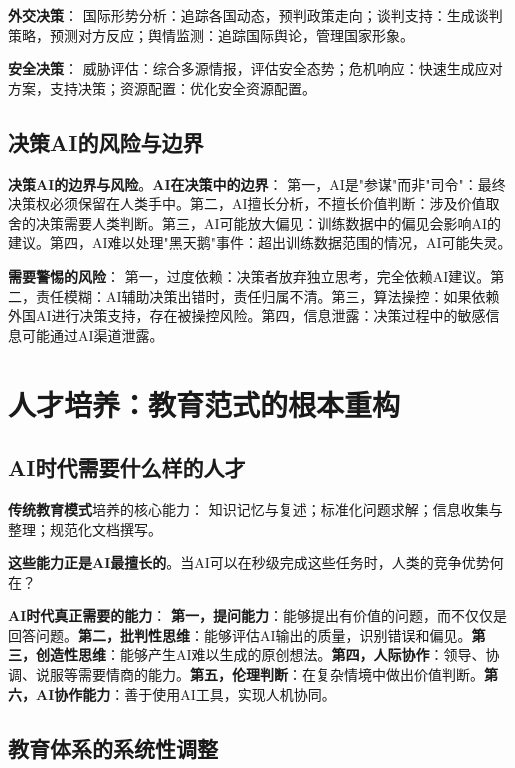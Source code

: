 \textbf{外交决策}：
国际形势分析：追踪各国动态，预判政策走向；谈判支持：生成谈判策略，预测对方反应；舆情监测：追踪国际舆论，管理国家形象。

\textbf{安全决策}：
威胁评估：综合多源情报，评估安全态势；危机响应：快速生成应对方案，支持决策；资源配置：优化安全资源配置。

\subsection{决策AI的风险与边界}

\textbf{决策AI的边界与风险}。\textbf{AI在决策中的边界}：
第一，AI是"参谋"而非"司令"：最终决策权必须保留在人类手中。第二，AI擅长分析，不擅长价值判断：涉及价值取舍的决策需要人类判断。第三，AI可能放大偏见：训练数据中的偏见会影响AI的建议。第四，AI难以处理"黑天鹅"事件：超出训练数据范围的情况，AI可能失灵。

\textbf{需要警惕的风险}：
第一，过度依赖：决策者放弃独立思考，完全依赖AI建议。第二，责任模糊：AI辅助决策出错时，责任归属不清。第三，算法操控：如果依赖外国AI进行决策支持，存在被操控风险。第四，信息泄露：决策过程中的敏感信息可能通过AI渠道泄露。

\section{人才培养：教育范式的根本重构}

\subsection{AI时代需要什么样的人才}

\textbf{传统教育模式}培养的核心能力：
知识记忆与复述；标准化问题求解；信息收集与整理；规范化文档撰写。

\textbf{这些能力正是AI最擅长的}。当AI可以在秒级完成这些任务时，人类的竞争优势何在？

\textbf{AI时代真正需要的能力}：
\textbf{第一，提问能力}：能够提出有价值的问题，而不仅仅是回答问题。\textbf{第二，批判性思维}：能够评估AI输出的质量，识别错误和偏见。\textbf{第三，创造性思维}：能够产生AI难以生成的原创想法。\textbf{第四，人际协作}：领导、协调、说服等需要情商的能力。\textbf{第五，伦理判断}：在复杂情境中做出价值判断。\textbf{第六，AI协作能力}：善于使用AI工具，实现人机协同。

\subsection{教育体系的系统性调整}


